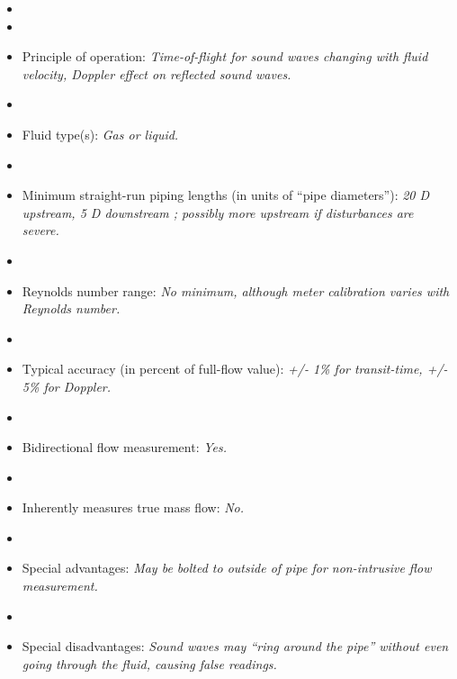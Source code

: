\begin{itemize}
\goodbreak
\item{} 
\vskip 5pt
\item\item{} Principle of operation: {\it Time-of-flight for sound waves changing with fluid velocity, Doppler effect on reflected sound waves.}
\vskip 5pt
\item\item{} Fluid type(s): {\it Gas or liquid.}
\vskip 5pt
\item\item{} Minimum straight-run piping lengths (in units of ``pipe diameters''): {\it 20 D upstream, 5 D downstream ; possibly more upstream if disturbances are severe.}
\vskip 5pt
\item\item{} Reynolds number range: {\it No minimum, although meter calibration varies with Reynolds number.}
\vskip 5pt
\item\item{} Typical accuracy (in percent of full-flow value): {\it +/- 1\% for transit-time, +/- 5\% for Doppler.}
\vskip 5pt
\item\item{} Bidirectional flow measurement: {\it Yes.}
\vskip 5pt
\item\item{} Inherently measures true mass flow: {\it No.}
\vskip 5pt
\item\item{} Special advantages: {\it May be bolted to outside of pipe for non-intrusive flow measurement.}
\vskip 5pt
\item\item{} Special disadvantages: {\it Sound waves may ``ring around the pipe'' without even going through the fluid, causing false readings.}
\end{itemize}

